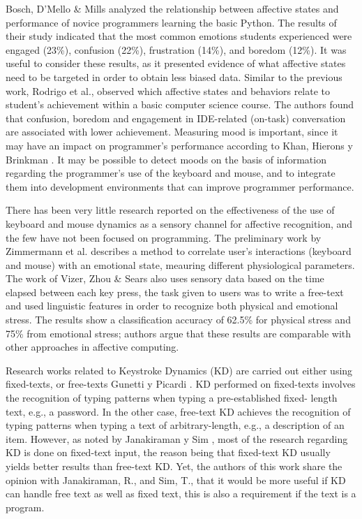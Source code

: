 \documentclass[a4paper]{llncs}
\begin{document}
Bosch, D'Mello \& Mills \cite{bosch2013emotions} analyzed the relationship between affective states
and performance of novice programmers learning the basic Python. The results of their study
indicated that the most common emotions students experienced were engaged
(23\%), confusion (22\%), frustration (14\%), and boredom (12\%). It was useful
to consider these results, as it presented evidence of what affective states
need to be targeted in order to obtain less biased data. Similar to
the previous work, Rodrigo et al., \cite{rodrigo2009affective} observed which affective states and
behaviors relate to student's achievement within a basic computer science
course. The authors found that confusion, boredom and engagement in IDE-related
(on-task) conversation are associated with lower achievement. Measuring mood is important, since it may have an impact on programmer’s performance according
to Khan, Hierons y Brinkman \cite{khan2007mood}. It may be possible to detect moods
on the basis of information regarding the programmer’s use of the keyboard and
mouse, and to integrate them into development environments that can improve
programmer performance. 

There has been very little research reported on the effectiveness of the use of
keyboard and mouse dynamics as a sensory channel for affective recognition, and
the few have not been focused on programming. The preliminary work by Zimmermann
et al. \cite{zimmermann2003affective} describes a method to correlate user’s interactions (keyboard and
mouse) with an emotional state, meauring different physiological parameters. The work of Vizer, Zhou \& Sears \cite{vizer2009automated} also
uses sensory data based on the time elapsed between each key press, the task
given to users was to write a free-text and used linguistic features in order to
recognize both physical and emotional stress. The results show a classification
accuracy of 62.5\% for physical stress and 75\% from emotional stress; authors
argue that these results are comparable with other approaches in affective
computing. 

Research works related to Keystroke Dynamics (KD) are carried out either using
fixed-texts, or free-texts Gunetti y Picardi \cite{gunetti2005keystroke}.
KD performed on fixed-texts
involves the recognition of typing patterns when typing a pre-established fixed-
length text, e.g., a password. In the other case, free-text KD achieves the
recognition of typing patterns when typing a text of arbitrary-length, e.g., a
description of an item. However, as noted by Janakiraman y Sim \cite{janakiraman2007keystroke},
most of
the research regarding KD is done on fixed-text input, the reason being that
fixed-text KD usually yields better results than free-text KD. Yet, the authors
of this work share the opinion with Janakiraman, R., and Sim, T., that it would
be more useful if KD can handle free text as well as fixed text, this is also a
requirement if the text is a program.
\end{document}
